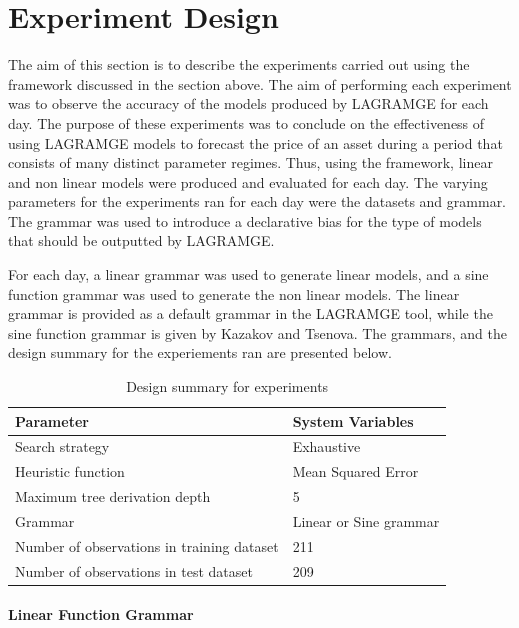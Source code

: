 \documentclass[13pt]{report}
\begin{document}
\section{Experiment Design}
The aim of this section is to describe the experiments carried out using the framework discussed in the section above. The aim of performing each experiment was to observe the accuracy of the models produced by LAGRAMGE for each day. The purpose of these experiments was to conclude on the effectiveness of using LAGRAMGE models to forecast the price of an asset during a period that consists of many distinct parameter regimes. Thus, using the framework, linear and non linear models were produced and evaluated for each day. The varying parameters for the experiments ran for each day were the datasets and grammar. The grammar was used to introduce a declarative bias for the type of models that should be outputted by LAGRAMGE. 

For each day, a linear grammar was used to generate linear models, and a sine function grammar was used to generate the non linear models. The linear grammar is provided as a default grammar in the LAGRAMGE tool, while the sine function grammar is given by Kazakov and Tsenova\cite{kazakov2009equation}. The grammars, and the design summary for the experiements ran are presented below.

\begin{table}[H]
\centering
\label{designsummary}
\begin{tabular}{|l|l|}
\hline
\textbf{Parameter}                         & \textbf{System Variables} \\ \hline
Search strategy                            & Exhaustive                \\ \hline
Heuristic function                         & Mean Squared Error        \\ \hline
Maximum tree derivation depth              & 5                         \\ \hline
Grammar                                    & Linear or Sine grammar    \\ \hline
Number of observations in training dataset & 211                       \\ \hline
Number of observations in test dataset     & 209                       \\ \hline
\end{tabular}
\caption{Design summary for experiments}
\end{table}

\paragraph{Linear Function Grammar} \hfill \break
\end{document}
